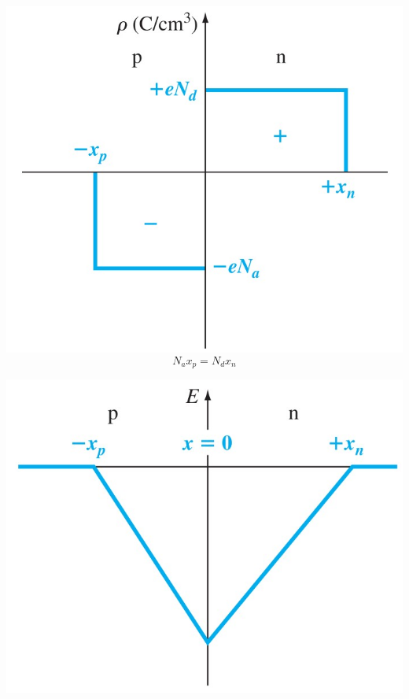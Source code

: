 \documentclass[a4paper, twocolumn]{article}
\begin{document}
    \begin{minipage}{\linewidth}
        \hspace{-1cm}
        \begin{minipage}[b]{0.49\linewidth}
                \includegraphics[width=0.95\linewidth]{Space-charge-density.jpg} \\
            \begin{equation*}
                N_a x_p = N_d x_n
            \end{equation*}
        \end{minipage}
        \begin{minipage}[b]{0.49\linewidth}
                \includegraphics[width=0.95\linewidth]{pn-junction-electric-field.jpg}\\

\end{minipage}
\end{minipage}
\end{document}
